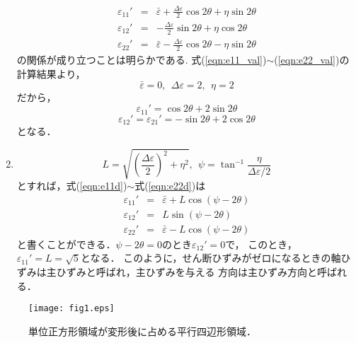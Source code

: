 \documentclass[10pt,a4j]{jarticle}
\begin{document}
\begin{enumerate}
\begin{eqnarray}
		\varepsilon_{11}' &=& 
			\bar \varepsilon + \frac{\Delta \varepsilon}{2} \cos 2\theta + \eta \sin 2\theta 
			\label{eqn:e11d}
			\\
		\varepsilon_{12}' &=& 
			-\frac{\Delta \varepsilon}{2} \sin 2\theta + \eta \cos 2\theta 
			\label{eqn:e12d}
			\\
		\varepsilon_{22}' &=& 
			\bar \varepsilon - \frac{\Delta \varepsilon}{2} \cos 2\theta - \eta \sin 2\theta 
			\label{eqn:e22d}
	\end{eqnarray}
	の関係が成り立つことは明らかである.
	式(\ref{eqn:e11_val})$\sim$(\ref{eqn:e22_val})の計算結果より，
	\[
		\bar\varepsilon = 0, \ \ \Delta \varepsilon =2, \ \ \eta =2
	\]
	だから，
	\[
		\varepsilon_{11}'=
		\cos 2\theta +2 \sin 2\theta 
	\]
	\[
		\varepsilon_{12}'=\varepsilon_{21}'
		=
		 -\sin 2\theta +2 \cos 2\theta 
	\]
	となる．
\item
	\begin{equation}
		L=\sqrt{\left(\frac{\Delta \varepsilon}{2}\right)^2 + \eta ^2 }, 
		\ \ 
		\psi=\tan^{-1}\frac{\eta}{\Delta \varepsilon/2}
	\end{equation}
	とすれば，式(\ref{eqn:e11d})$\sim$式(\ref{eqn:e22d})は
	\begin{eqnarray}
		\varepsilon_{11}' &=& 
			\bar \varepsilon + 
			L \cos \left( \psi-2\theta  \right)	
			\label{eqn:e11d2}
			\\
		\varepsilon_{12}' &=& 
			L \sin \left( \psi-2\theta  \right)	
			\label{eqn:e12d2}
			\\
		\varepsilon_{22}' &=& 
			\bar \varepsilon - 
			L \cos \left( \psi-2\theta  \right)	
			\label{eqn:e22d2}
	\end{eqnarray}
	と書くことができる．$\psi-2\theta=0$のとき$\varepsilon_{12}'=0$で，
	このとき，$\varepsilon_{11}'=L=\sqrt{5}$となる．
	このように，せん断ひずみがゼロになるときの軸ひずみは主ひずみと呼ばれ，主ひずみを与える
	方向は主ひずみ方向と呼ばれる．
\end{enumerate}
\begin{figure}[h]
	\begin{center}
	\texttt{[image: fig1.eps]} 
	\end{center}
	\vspace{-5mm}
	\caption{単位正方形領域が変形後に占める平行四辺形領域．} 
	\label{fig:fig1}
\end{figure}
\end{document}
